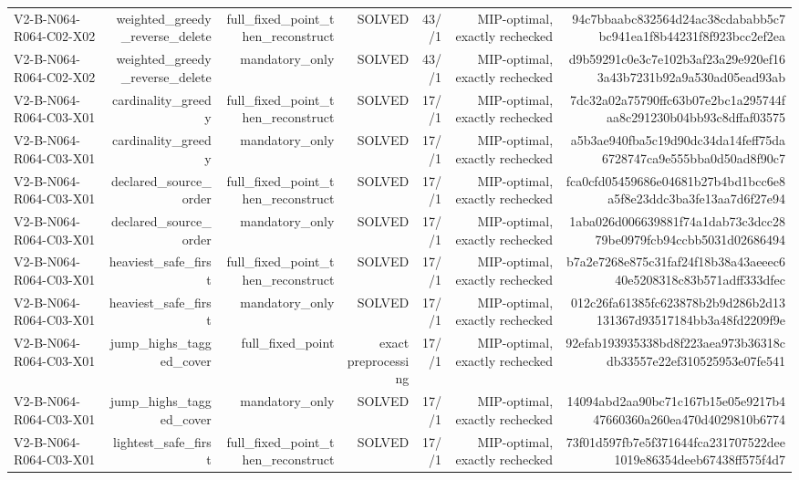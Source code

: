 {\begin{longtable}{lrrrrrr}
V2-B-N064-R064-C02-X02 & weighted\_greedy\_reverse\_delete & full\_fixed\_point\_then\_reconstruct & SOLVED & 43//1 & MIP-optimal, exactly rechecked & 94c7bbaabc832564d24ac38cdababb5c7bc941ea1f8b44231f8f923bcc2ef2ea \\
V2-B-N064-R064-C02-X02 & weighted\_greedy\_reverse\_delete & mandatory\_only & SOLVED & 43//1 & MIP-optimal, exactly rechecked & d9b59291c0e3c7e102b3af23a29e920ef163a43b7231b92a9a530ad05ead93ab \\
V2-B-N064-R064-C03-X01 & cardinality\_greedy & full\_fixed\_point\_then\_reconstruct & SOLVED & 17//1 & MIP-optimal, exactly rechecked & 7dc32a02a75790ffc63b07e2bc1a295744faa8c291230b04bb93c8dffaf03575 \\
V2-B-N064-R064-C03-X01 & cardinality\_greedy & mandatory\_only & SOLVED & 17//1 & MIP-optimal, exactly rechecked & a5b3ae940fba5c19d90dc34da14feff75da6728747ca9e555bba0d50ad8f90c7 \\
V2-B-N064-R064-C03-X01 & declared\_source\_order & full\_fixed\_point\_then\_reconstruct & SOLVED & 17//1 & MIP-optimal, exactly rechecked & fca0cfd05459686e04681b27b4bd1bcc6e8a5f8e23ddc3ba3fe13aa7d6f27e94 \\
V2-B-N064-R064-C03-X01 & declared\_source\_order & mandatory\_only & SOLVED & 17//1 & MIP-optimal, exactly rechecked & 1aba026d006639881f74a1dab73c3dcc2879be0979fcb94ccbb5031d02686494 \\
V2-B-N064-R064-C03-X01 & heaviest\_safe\_first & full\_fixed\_point\_then\_reconstruct & SOLVED & 17//1 & MIP-optimal, exactly rechecked & b7a2e7268e875c31faf24f18b38a43aeeec640e5208318c83b571adff333dfec \\
V2-B-N064-R064-C03-X01 & heaviest\_safe\_first & mandatory\_only & SOLVED & 17//1 & MIP-optimal, exactly rechecked & 012c26fa61385fc623878b2b9d286b2d13131367d93517184bb3a48fd2209f9e \\
V2-B-N064-R064-C03-X01 & jump\_highs\_tagged\_cover & full\_fixed\_point & exact preprocessing & 17//1 & MIP-optimal, exactly rechecked & 92efab193935338bd8f223aea973b36318cdb33557e22ef310525953e07fe541 \\
V2-B-N064-R064-C03-X01 & jump\_highs\_tagged\_cover & mandatory\_only & SOLVED & 17//1 & MIP-optimal, exactly rechecked & 14094abd2aa90bc71c167b15e05e9217b447660360a260ea470d4029810b6774 \\
V2-B-N064-R064-C03-X01 & lightest\_safe\_first & full\_fixed\_point\_then\_reconstruct & SOLVED & 17//1 & MIP-optimal, exactly rechecked & 73f01d597fb7e5f371644fca231707522dee1019e86354deeb67438ff575f4d7 \\

\end{longtable}}
